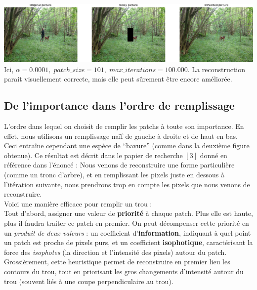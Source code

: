 \documentclass[a4paper]{memoir}
\begin{document}
\begin{center}
\includegraphics[scale=0.4]{res/outdoor_parfait.png}\\
\small{Ici, $\alpha=0.0001,\; patch\_size=101,\; max\_iterations=100.000$. La reconstruction parait visuellement correcte, mais elle peut sûrement être encore améliorée.}
\end{center}


\newpage
\subsection{De l'importance dans l'ordre de remplissage}
L'ordre dans lequel on choisit de remplir les patchs à toute son importance. En effet, nous utilisons un remplissage naïf de gauche à droite et de haut en bas. Ceci entraîne cependant une espèce de ``bavure'' (comme dans la deuxième figure obtenue). Ce résultat est décrit dans le papier de recherche $[3]$ donné en référence dans l'énoncé : Nous venons de reconstruire une forme particulière (comme un tronc d'arbre), et en remplissant les pixels juste en dessous à l'itération suivante, nous prendrons trop en compte les pixels que nous venons de reconstruire.\\
Voici une manière efficace pour remplir un trou :\\
Tout d'abord, assigner une valeur de \textbf{priorité} à chaque patch. Plus elle est haute, plus il faudra traiter ce patch en premier. On peut décompenser cette priorité en un \textit{produit de deux valeurs} : un coefficient d'\textbf{information}, indiquant à quel point un patch est proche de pixels purs, et un coefficient \textbf{isophotique}, caractérisant la force des \textit{isophotes} (la direction et l'intensité des pixels) autour du patch.\\
Grossièrement, cette heuristique permet de reconstruire en premier lieu les contours du trou, tout en priorisant les gros changements d'intensité autour du trou (souvent liés à une coupe perpendiculaire au trou).
\end{document}

